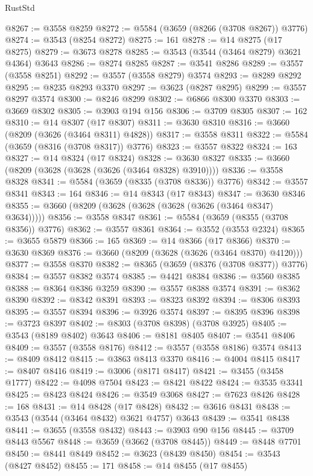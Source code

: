\begin{lexlean}{RustStd}
\begin{coremodule}
@8267 := @3558 @8259
@8272 := @5584 (@3659 (@8266 (@3708 @8267)) @3776)
@8274 := @3543 (@8254 @8272)
@8275 := 161
@8278 := @14 @8275 (@17 @8275)
@8279 := @3673 @8278
@8285 := @3543 (@3544 (@3464 @8279) @3621 @4364) @3643
@8286 := @8274 @8285
@8287 := @3541 @8286
@8289 := @3557 (@3558 @8251)
@8292 := @3557 (@3558 @8279) @3574
@8293 := @8289 @8292
@8295 := @8235 @8293 @3370
@8297 := @3623 (@8287 @8295)
@8299 := @3557 @8297 @3574
@8300 := @8246 @8299
@8302 := @6866 @8300 @3370
@8303 := @3669 @8302
@8305 := @3903 @194 @156
@8306 := @3709 @8305
@8307 := 162
@8310 := @14 @8307 (@17 @8307)
@8311 := @3630 @8310
@8316 := @3660 (@8209 (@3626 (@3464 @8311) @4828))
@8317 := @3558 @8311
@8322 := @5584 (@3659 (@8316 (@3708 @8317)) @3776)
@8323 := @3557 @8322
@8324 := 163
@8327 := @14 @8324 (@17 @8324)
@8328 := @3630 @8327
@8335 := @3660 (@8209 (@3628 (@3628 (@3626 (@3464 @8328) @3910))))
@8336 := @3558 @8328
@8341 := @5584 (@3659 (@8335 (@3708 @8336)) @3776)
@8342 := @3557 @8341
@8343 := 164
@8346 := @14 @8343 (@17 @8343)
@8347 := @3630 @8346
@8355 := @3660 (@8209 (@3628 (@3628 (@3628 (@3626 (@3464 @8347) @3634)))))
@8356 := @3558 @8347
@8361 := @5584 (@3659 (@8355 (@3708 @8356)) @3776)
@8362 := @3557 @8361
@8364 := @3552 (@3553 @2324)
@8365 := @3655 @5879
@8366 := 165
@8369 := @14 @8366 (@17 @8366)
@8370 := @3630 @8369
@8376 := @3660 (@8209 (@3628 (@3626 (@3464 @8370) @4120)))
@8377 := @3558 @8370
@8382 := @8365 (@3659 (@8376 (@3708 @8377)) @3776)
@8384 := @3557 @8382 @3574
@8385 := @4421 @8384
@8386 := @3560 @8385
@8388 := @8364 @8386 @3259
@8390 := @3557 @8388 @3574
@8391 := @8362 @8390
@8392 := @8342 @8391
@8393 := @8323 @8392
@8394 := @8306 @8393
@8395 := @3557 @8394
@8396 := @3926 @3574
@8397 := @8395 @8396
@8398 := @3723 @8397
@8402 := @8303 (@3708 @8398) (@3708 @3925)
@8405 := @3543 (@8189 @8402) @3643
@8406 := @8181 @8405
@8407 := @3541 @8406
@8409 := @3557 (@3558 @8176)
@8412 := @3557 (@3558 @8186) @3574
@8413 := @8409 @8412
@8415 := @3863 @8413 @3370
@8416 := @4004 @8415
@8417 := @8407 @8416
@8419 := @3006 (@8171 @8417)
@8421 := @3455 (@3458 @1777)
@8422 := @4098 @7504
@8423 := @8421 @8422
@8424 := @3535 @3341
@8425 := @8423 @8424
@8426 := @3549 @3068
@8427 := @7623 @8426
@8428 := 168
@8431 := @14 @8428 (@17 @8428)
@8432 := @3616 @8431
@8438 := @3543 (@3544 (@3464 @8432) @3621 @4757) @3643
@8439 := @3541 @8438
@8441 := @3655 (@3558 @8432)
@8443 := @3903 @90 @156
@8445 := @3709 @8443 @5567
@8448 := @3659 (@3662 (@3708 @8445))
@8449 := @8448 @7701
@8450 := @8441 @8449
@8452 := @3623 (@8439 @8450)
@8454 := @3543 (@8427 @8452)
@8455 := 171
@8458 := @14 @8455 (@17 @8455)

\end{coremodule}
\end{lexlean}
